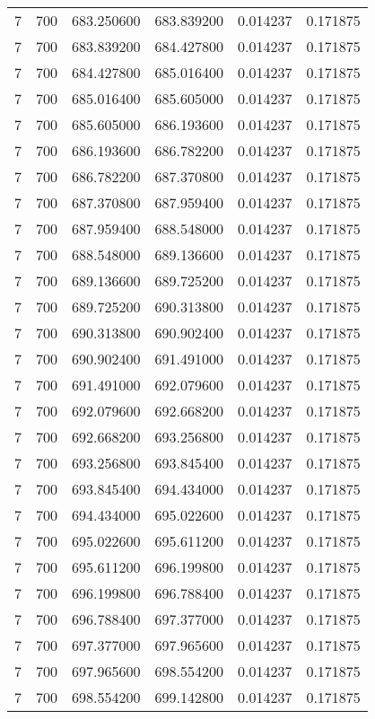 \begin{longtable}{rrrrrr}
7 & 700 & 683.250600 & 683.839200 & 0.014237 & 0.171875 \\
7 & 700 & 683.839200 & 684.427800 & 0.014237 & 0.171875 \\
7 & 700 & 684.427800 & 685.016400 & 0.014237 & 0.171875 \\
7 & 700 & 685.016400 & 685.605000 & 0.014237 & 0.171875 \\
7 & 700 & 685.605000 & 686.193600 & 0.014237 & 0.171875 \\
7 & 700 & 686.193600 & 686.782200 & 0.014237 & 0.171875 \\
7 & 700 & 686.782200 & 687.370800 & 0.014237 & 0.171875 \\
7 & 700 & 687.370800 & 687.959400 & 0.014237 & 0.171875 \\
7 & 700 & 687.959400 & 688.548000 & 0.014237 & 0.171875 \\
7 & 700 & 688.548000 & 689.136600 & 0.014237 & 0.171875 \\
7 & 700 & 689.136600 & 689.725200 & 0.014237 & 0.171875 \\
7 & 700 & 689.725200 & 690.313800 & 0.014237 & 0.171875 \\
7 & 700 & 690.313800 & 690.902400 & 0.014237 & 0.171875 \\
7 & 700 & 690.902400 & 691.491000 & 0.014237 & 0.171875 \\
7 & 700 & 691.491000 & 692.079600 & 0.014237 & 0.171875 \\
7 & 700 & 692.079600 & 692.668200 & 0.014237 & 0.171875 \\
7 & 700 & 692.668200 & 693.256800 & 0.014237 & 0.171875 \\
7 & 700 & 693.256800 & 693.845400 & 0.014237 & 0.171875 \\
7 & 700 & 693.845400 & 694.434000 & 0.014237 & 0.171875 \\
7 & 700 & 694.434000 & 695.022600 & 0.014237 & 0.171875 \\
7 & 700 & 695.022600 & 695.611200 & 0.014237 & 0.171875 \\
7 & 700 & 695.611200 & 696.199800 & 0.014237 & 0.171875 \\
7 & 700 & 696.199800 & 696.788400 & 0.014237 & 0.171875 \\
7 & 700 & 696.788400 & 697.377000 & 0.014237 & 0.171875 \\
7 & 700 & 697.377000 & 697.965600 & 0.014237 & 0.171875 \\
7 & 700 & 697.965600 & 698.554200 & 0.014237 & 0.171875 \\
7 & 700 & 698.554200 & 699.142800 & 0.014237 & 0.171875 \\

\end{longtable}

